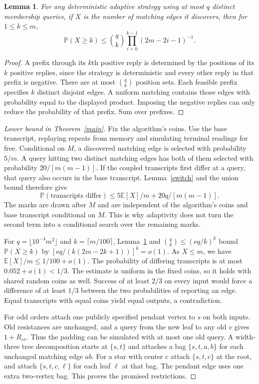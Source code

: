 \documentclass[11pt]{article}
\newtheorem{lemma}{Lemma}
\newcommand{\E}{\mathbb E}
\newcommand{\Prb}{\mathbb P}
\begin{document}
\begin{lemma}\label{matching}
For any deterministic adaptive strategy using at most $q$ distinct membership queries, if $X$ is the number of matching edges it discovers, then for $1\le k\le m$,
\[
 \Prb(X\ge k)\le {q\choose k}\prod_{i=0}^{k-1}(2m-2i-1)^{-1}.
\]
\end{lemma}
\begin{proof}
A prefix through its $k$th positive reply is determined by the positions of its $k$ positive replies, since the strategy is deterministic and every other reply in that prefix is negative. There are at most $\binom qk$ position sets. Each feasible prefix specifies $k$ distinct disjoint edges. A uniform matching contains those edges with probability equal to the displayed product. Imposing the negative replies can only reduce the probability of that prefix. Sum over prefixes.
\end{proof}

\begin{proof}[Lower bound in Theorem~\ref{main}]
Fix the algorithm's coins. Use the base transcript, replaying repeats from memory and simulating terminal readings for free. Conditional on $M$, a discovered matching edge is selected with probability $5/m$. A query hitting two distinct matching edges has both of them selected with probability $20/[m(m-1)]$. If the coupled transcripts first differ at a query, that query also occurs in the base transcript. Lemma~\ref{switch} and the union bound therefore give
\[
 \Prb(\text{transcripts differ})\le
 5\E[X]/m+20q/[m(m-1)].
\]
The marks are drawn after $M$ and are independent of the algorithm's coins and base transcript conditional on $M$. This is why adaptivity does not turn the second term into a conditional search over the remaining marks.

For $q=\lfloor 10^{-4}m^2\rfloor$ and $k=\lceil m/100\rceil$, Lemma~\ref{matching} and $\binom qk\le(\mathrm{e}q/k)^k$ bound $\Prb(X\ge k)$ by $[\mathrm{e}q/(k(2m-2k+1))]^k=o(1)$. As $X\le m$, we have $\E[X]/m\le 1/100+o(1)$. The probability of differing transcripts is at most $0.052+o(1)<1/3$. The estimate is uniform in the fixed coins, so it holds with shared random coins as well. Success of at least $2/3$ on every input would force a difference of at least $1/3$ between the two probabilities of reporting an edge. Equal transcripts with equal coins yield equal outputs, a contradiction.

For odd orders attach one publicly specified pendant vertex to $s$ on both inputs. Old resistances are unchanged, and a query from the new leaf to any old $v$ gives $1+R_{sv}$. Thus the padding can be simulated with at most one old query. A width-three tree decomposition starts at $\{s,t\}$ and attaches a bag $\{s,t,a,b\}$ for each unchanged matching edge $ab$. For a star with center $c$ attach $\{s,t,c\}$ at the root, and attach $\{s,t,c,\ell\}$ for each leaf $\ell$ at that bag. The pendant edge uses one extra two-vertex bag. This proves the promised restrictions.
\end{proof}
\end{document}

